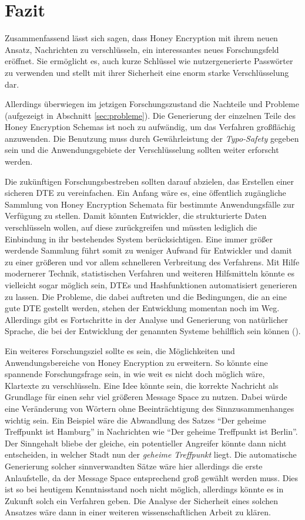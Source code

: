 \section{Fazit}
\label{sec:fazit}
Zusammenfassend lässt sich sagen, dass Honey Encryption mit ihrem neuen Ansatz, Nachrichten zu verschlüsseln, ein interessantes neues Forschungsfeld eröffnet. Sie ermöglicht es, auch kurze Schlüssel wie nutzergenerierte Passwörter zu verwenden und stellt mit ihrer Sicherheit eine enorm starke Verschlüsselung dar.

Allerdings überwiegen im jetzigen Forschungszustand die Nachteile und Probleme (aufgezeigt in Abschnitt \ref{sec:probleme}). Die Generierung der einzelnen Teile des Honey Encryption Schemas ist noch zu aufwändig, um das Verfahren großflächig anzuwenden. Die Benutzung muss durch Gewährleistung der \emph{Typo-Safety} gegeben sein und die Anwendungsgebiete der Verschlüsselung sollten weiter erforscht werden.

Die zukünftigen Forschungsbestreben sollten darauf abzielen, das Erstellen einer sicheren DTE zu vereinfachen. Ein Anfang wäre es, eine öffentlich zugängliche Sammlung von Honey Encryption Schemata für bestimmte Anwendungsfälle zur Verfügung zu stellen. Damit könnten Entwickler, die strukturierte Daten verschlüsseln wollen, auf diese zurückgreifen und müssten lediglich die Einbindung in ihr bestehendes System berücksichtigen. Eine immer größer werdende Sammlung führt somit zu weniger Aufwand für Entwickler und damit zu einer größeren und vor allem schnelleren Verbreitung des Verfahrens. Mit Hilfe modernerer Technik, statistischen Verfahren und weiteren Hilfsmitteln könnte es vielleicht sogar möglich sein, DTEs und Hashfunktionen automatisiert generieren zu lassen. Die Probleme, die dabei auftreten und die Bedingungen, die an eine gute DTE gestellt werden, stehen der Entwicklung momentan noch im Weg. Allerdings gibt es Fortschritte in der Analyse und Generierung von natürlicher Sprache, die bei der Entwicklung der genannten Systeme behilflich sein können (\cite{CRCS2014}).

Ein weiteres Forschungsziel sollte es sein, die Möglichkeiten und Anwendungsbereiche von Honey Encryption zu erweitern. So könnte eine spannende Forschungsfrage sein, in wie weit es nicht doch möglich wäre, Klartexte zu verschlüsseln. Eine Idee könnte sein, die korrekte Nachricht als Grundlage für einen sehr viel größeren Message Space zu nutzen. Dabei würde eine Veränderung von Wörtern ohne Beeinträchtigung des Sinnzusammenhanges wichtig sein. Ein Beispiel wäre die Abwandlung des Satzes ``Der geheime Treffpunkt ist Hamburg'' in Nachrichten wie ``Der geheime Treffpunkt ist Berlin''. Der Sinngehalt bliebe der gleiche, ein potentieller Angreifer könnte dann nicht entscheiden, in welcher Stadt nun der \emph{geheime Treffpunkt} liegt. Die automatische Generierung solcher sinnverwandten Sätze wäre hier allerdings die erste Anlaufstelle, da der Message Space entsprechend groß gewählt werden muss. Dies ist so bei heutigem Kenntnisstand noch nicht möglich, allerdings könnte es in Zukunft solch ein Verfahren geben. Die Analyse der Sicherheit eines solchen Ansatzes wäre dann in einer weiteren wissenschaftlichen Arbeit zu klären.

